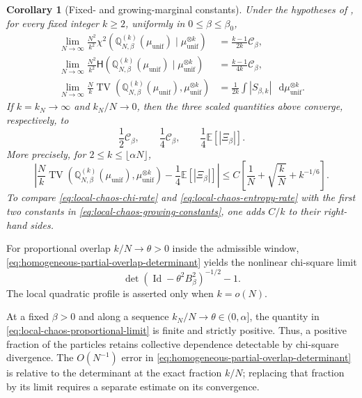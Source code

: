 \documentclass[11pt,reqno]{amsart}
\numberwithin{equation}{section}
\theoremstyle{plain}
\newtheorem{cor}[cor]{Corollary}
\theoremstyle{definition}
\newcommand{\dd}{\mathop{}\!\mathrm d}
\newcommand{\E}{\mathbb E}
\newcommand{\Q}{\mathbb Q}
\newcommand{\Id}{\operatorname{Id}}
\newcommand{\TV}{\operatorname{TV}}
\newcommand{\be}{\beta}
\newcommand{\Hr}{\mathsf H}
\newcommand{\muunif}{\mu_{\mathrm{unif}}}
\begin{document}
\begin{cor}[Fixed- and growing-marginal constants]
\label{cor:homogeneous-local-chaos-limits}
Under the hypotheses of , for every fixed integer $k\geq2$, uniformly in $0\leq\be\leq\be_0$,
\begin{align}
 \lim_{N\to\infty}\frac{N^2}{k^2}
 \chi^2\!\left(\Q_{N,\be}^{(k)}(\muunif)\mid\muunif^{\otimes k}\right)
 &=\frac{k-1}{2k}\mathcal C_{\be},
 \label{eq:local-chaos-fixed-chi}\\
 \lim_{N\to\infty}\frac{N^2}{k^2}
 \Hr\!\left(\Q_{N,\be}^{(k)}(\muunif)\mid\muunif^{\otimes k}\right)
 &=\frac{k-1}{4k}\mathcal C_{\be},
 \label{eq:local-chaos-fixed-entropy}\\
 \lim_{N\to\infty}\frac Nk
 \TV\!\left(\Q_{N,\be}^{(k)}(\muunif),\muunif^{\otimes k}\right)
 &=\frac1{2k}\int|S_{\be,k}|\,\dd\muunif^{\otimes k}.
 \label{eq:local-chaos-fixed-TV}
\end{align}
If $k=k_N\to\infty$ and $k_N/N\to0$, then the three scaled quantities above converge, respectively, to
\begin{equation}
 \frac12\mathcal C_{\be},
 \qquad
 \frac14\mathcal C_{\be},
 \qquad
 \frac14\E[|\Xi_{\be}|].
 \label{eq:local-chaos-growing-constants}
\end{equation}
More precisely, for $2\leq k\leq\lfloor\alpha N\rfloor$,
\begin{equation}
 \left|\frac Nk
 \TV\!\left(\Q_{N,\be}^{(k)}(\muunif),\muunif^{\otimes k}\right)
 -\frac14\E[|\Xi_{\be}|]\right|
 \leq C\left[\frac1N+\sqrt{\frac{k}{N}}+k^{-1/6}\right].
 \label{eq:local-chaos-growing-TV-rate}
\end{equation}
To compare \eqref{eq:local-chaos-chi-rate} and \eqref{eq:local-chaos-entropy-rate} with the first two constants in \eqref{eq:local-chaos-growing-constants}, one adds $C/k$ to their right-hand sides.
\end{cor}

For proportional overlap $k/N\to\theta>0$ inside the admissible window, \eqref{eq:homogeneous-partial-overlap-determinant} yields the nonlinear chi-square limit
\begin{equation}
 \det(\Id-\theta^2B_{\be}^2)^{-1/2}-1.
 \label{eq:local-chaos-proportional-limit}
\end{equation}
The local quadratic profile is asserted only when $k=o(N)$.

At a fixed $\be>0$ and along a sequence $k_N/N\to\theta\in(0,\alpha]$, the quantity in \eqref{eq:local-chaos-proportional-limit} is finite and strictly positive. Thus, a positive fraction of the particles retains collective dependence detectable by chi-square divergence. The $O(N^{-1})$ error in \eqref{eq:homogeneous-partial-overlap-determinant} is relative to the determinant at the exact fraction $k/N$; replacing that fraction by its limit requires a separate estimate on its convergence.
\end{document}
